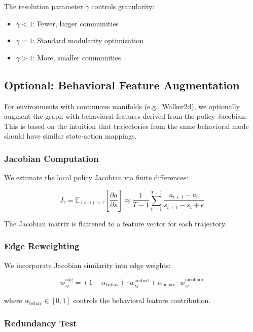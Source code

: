 \documentclass{article}
\begin{document}
The resolution parameter $\gamma$ controls granularity:
\begin{itemize}
    \item $\gamma < 1$: Fewer, larger communities
    \item $\gamma = 1$: Standard modularity optimization
    \item $\gamma > 1$: More, smaller communities
\end{itemize}

\subsection{Optional: Behavioral Feature Augmentation}

For environments with continuous manifolds (e.g., Walker2d), we optionally augment the graph with behavioral features derived from the policy Jacobian. This is based on the intuition that trajectories from the same behavioral mode should have similar state-action mappings.

\subsubsection{Jacobian Computation}

We estimate the local policy Jacobian via finite differences:

\begin{equation}
    J_\tau = \mathbb{E}_{(s,a) \sim \tau}\left[\frac{\partial a}{\partial s}\right] \approx \frac{1}{T-1} \sum_{t=1}^{T-1} \frac{a_{t+1} - a_t}{s_{t+1} - s_t + \epsilon}
\end{equation}

The Jacobian matrix is flattened to a feature vector for each trajectory.

\subsubsection{Edge Reweighting}

We incorporate Jacobian similarity into edge weights:

\begin{equation}
    w_{ij}^{\text{aug}} = (1 - \alpha_{\text{behav}}) \cdot w_{ij}^{\text{embed}} + \alpha_{\text{behav}} \cdot w_{ij}^{\text{jacobian}}
\end{equation}

where $\alpha_{\text{behav}} \in [0, 1]$ controls the behavioral feature contribution.

\subsubsection{Redundancy Test}
\end{document}
